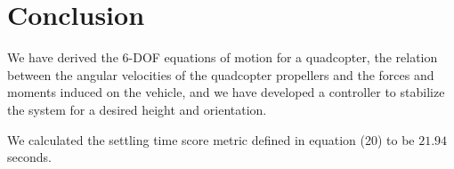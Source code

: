 \section*{Conclusion}

We have derived the 6-DOF equations of motion for a quadcopter, the relation between the angular velocities of the quadcopter propellers and the forces and moments induced on the vehicle, and we have developed a controller to stabilize the system for a desired height and orientation.

We calculated the settling time score metric defined in equation (20) to be $\boxed{21.94}$ seconds.